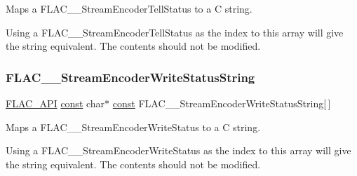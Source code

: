Maps a F\+L\+A\+C\+\_\+\+\_\+\+Stream\+Encoder\+Tell\+Status to a C string.

Using a F\+L\+A\+C\+\_\+\+\_\+\+Stream\+Encoder\+Tell\+Status as the index to this array will give the string equivalent. The contents should not be modified. \mbox{\label{group__flac__stream__encoder_ga00e6218364ced330f52c625061dfa485}} 
\subsubsection{\texorpdfstring{F\+L\+A\+C\+\_\+\+\_\+\+Stream\+Encoder\+Write\+Status\+String}{FLAC\_\_StreamEncoderWriteStatusString}}
{\footnotesize\ttfamily \hyperlink{group__flac__export_ga56ca07df8a23310707732b1c0007d6f5}{F\+L\+A\+C\+\_\+\+A\+PI} \hyperlink{zconf_8h_a2c212835823e3c54a8ab6d95c652660e}{const} char$\ast$ \hyperlink{zconf_8h_a2c212835823e3c54a8ab6d95c652660e}{const} F\+L\+A\+C\+\_\+\+\_\+\+Stream\+Encoder\+Write\+Status\+String\mbox{[}$\,$\mbox{]}}

Maps a F\+L\+A\+C\+\_\+\+\_\+\+Stream\+Encoder\+Write\+Status to a C string.

Using a F\+L\+A\+C\+\_\+\+\_\+\+Stream\+Encoder\+Write\+Status as the index to this array will give the string equivalent. The contents should not be modified. 